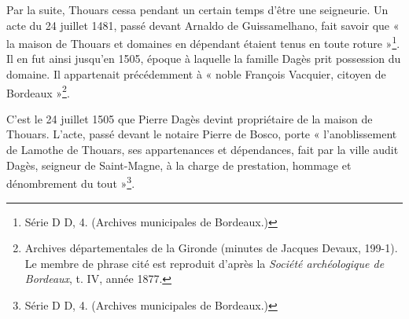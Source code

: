 Par la suite, Thouars cessa pendant un certain temps d'être une seigneurie. Un acte du 24 juillet 1481, passé devant Arnaldo de Guissamelhano, fait savoir que « la maison de Thouars et domaines en dépendant étaient tenus en toute roture »\footnote{Série D D, 4. (Archives municipales de Bordeaux.)}. Il en fut ainsi jusqu'en 1505, époque à laquelle la famille Dagès prit possession du domaine. Il appartenait précédemment à « noble François Vacquier, citoyen de Bordeaux »\footnote{Archives départementales de la Gironde (minutes de Jacques Devaux, 199-1). Le membre de phrase cité est reproduit d'après la \textit{Société archéologique de Bordeaux}, t. IV, année 1877.}.

C'est le 24 juillet 1505 que Pierre Dagès devint propriétaire de la maison de Thouars. L'acte, passé devant le notaire Pierre de Bosco, porte « l'anoblissement de Lamothe de Thouars, ses appartenances et dépendances, fait par la ville audit Dagès, seigneur de Saint-Magne, à la charge de prestation, hommage et dénombrement du tout »\footnote{Série D D, 4. (Archives municipales de Bordeaux.)}.

